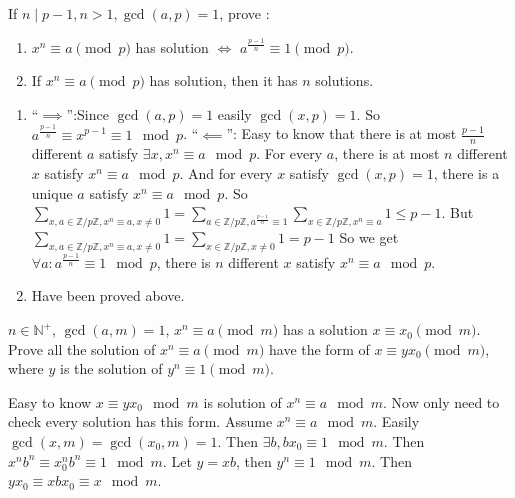 \documentclass{ctexart}
\begin{document}
\begin{problem}\label{pro:4}
  If \(n \mid p-1, n > 1,\gcd(a,p)=1\), prove :
  \begin{enumerate}
    \item \(x^n \equiv a \pmod{ p}\) has solution \(\iff\) \(a^{\frac{p-1}{n}} \equiv 1 \pmod{ p}\).
    \item If \(x^n \equiv a \pmod{ p}\) has solution, then it has \(n\) solutions.
  \end{enumerate}
\end{problem}
\begin{solution}
  \begin{enumerate}
    \item ``\(\implies\)'':Since \(\gcd(a,p)=1\) easily \(\gcd(x,p)=1\). So \(a^{\frac{p-1}{n}} \equiv x^{p-1} \equiv 1 \mod p\).
      ``\(\impliedby\)'': Easy to know that there is at most \(\frac{p-1}{n}\) different \(a\) satisfy \(\exists x,x^n \equiv a \mod p\).
      For every \(a\), there is at most \(n\) different \(x\) satisfy \(x^n \equiv a \mod p\).
      And for every \(x\) satisfy \(\gcd(x,p)=1\), there is a unique \(a\) satisfy \(x^n \equiv a \mod p\).
      So \(\sum_{x,a \in \mathbb{Z} / p \mathbb{Z},x^n \equiv a,x \neq 0}1=\sum_{a \in \mathbb{Z} / p \mathbb{Z},a^{\frac{p-1}{n}} \equiv 1}\sum_{x \in \mathbb{Z} / p \mathbb{Z},x^n \equiv a}1 \leq p-1\).
      But \(\sum_{x,a \in \mathbb{Z} / p \mathbb{Z},x^n \equiv a,x \neq 0}1=\sum_{x \in \mathbb{Z} / p \mathbb{Z},x \neq 0} 1 = p-1\)
      So we get \(\forall a:a^{\frac{p-1}{n}}\equiv 1 \mod p\), there is \(n\) different \(x\) satisfy \(x^n \equiv a \mod p\).
    \item Have been proved above.
  \end{enumerate}
\end{solution}

\begin{problem}\label{pro:5}
  \(n \in \mathbb{N}^+\), \(\gcd(a,m)=1\), \(x^n \equiv a \pmod{ m}\) has a solution \(x \equiv x_0 \pmod{ m}\).
  Prove all the solution of \(x^n \equiv a \pmod{ m}\) have the form of \(x \equiv yx_0 \pmod{ m}\),
  where \(y\) is the solution of \(y^n \equiv 1\pmod{ m}\).
\end{problem}
\begin{solution}
  Easy to know \(x \equiv y x_0 \mod m\) is solution of \(x^n \equiv a \mod m\).
  Now only need to check every solution has this form.
  Assume \(x^n \equiv a \mod m\). Easily \(\gcd(x,m)=\gcd(x_0,m)=1\).
  Then \(\exists b,bx_0 \equiv 1 \mod m\).
  Then \(x^n b^n \equiv x_0^n b^n \equiv 1 \mod m\).
  Let \(y = xb\), then \(y^n \equiv 1 \mod m\).
  Then \(y x_0 \equiv x b x_0 \equiv x \mod m\).
\end{solution}
\end{document}

